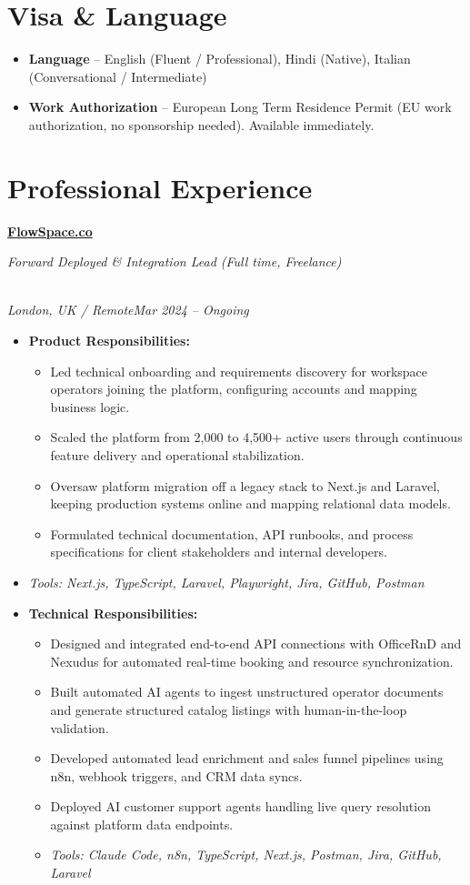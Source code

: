 \documentclass[a4paper,10pt]{article}
\newcommand{\role}[4]{\vspace{3pt}\noindent\hspace{0.6em}\parbox[t]{0.38\textwidth}{\raggedright\textbf{#1}}\hfill\parbox[t]{0.58\textwidth}{\raggedleft\textit{#2}}\\{\textit{#3}\hfill\textit{#4}}\vspace{1pt}}
\begin{document}
\section{Visa \& Language}
\begin{itemize}
\item \textbf{Language} -- English (Fluent / Professional), Hindi (Native), Italian (Conversational / Intermediate)
\item \textbf{Work Authorization} -- European Long Term Residence Permit (EU work authorization, no sponsorship needed). Available immediately.
\end{itemize}

\section{Professional Experience}
\role{\href{https://flowspace.co}{FlowSpace.co}}{Forward Deployed \& Integration Lead (Full time, Freelance)}{London, UK / Remote}{Mar 2024 -- Ongoing}
\begin{itemize}
\item \textbf{Product Responsibilities:}
\begin{itemize}[label=--]
\item Led technical onboarding and requirements discovery for workspace operators joining the platform, configuring accounts and mapping business logic.
\item Scaled the platform from 2,000 to 4,500+ active users through continuous feature delivery and operational stabilization.
\item Oversaw platform migration off a legacy stack to Next.js and Laravel, keeping production systems online and mapping relational data models.
\item Formulated technical documentation, API runbooks, and process specifications for client stakeholders and internal developers.
\end{itemize}
\item \textit{Tools: Next.js, TypeScript, Laravel, Playwright, Jira, GitHub, Postman}
\item \textbf{Technical Responsibilities:}
\begin{itemize}[label=--]
\item Designed and integrated end-to-end API connections with OfficeRnD and Nexudus for automated real-time booking and resource synchronization.
\item Built automated AI agents to ingest unstructured operator documents and generate structured catalog listings with human-in-the-loop validation.
\item Developed automated lead enrichment and sales funnel pipelines using n8n, webhook triggers, and CRM data syncs.
\item Deployed AI customer support agents handling live query resolution against platform data endpoints.
\item \textit{Tools: Claude Code, n8n, TypeScript, Next.js, Postman, Jira, GitHub, Laravel}
\end{itemize}
\end{itemize}
\end{document}
